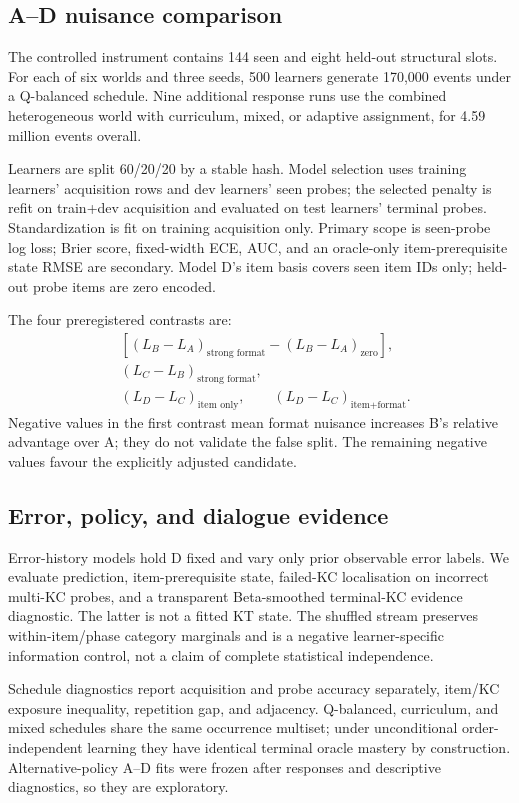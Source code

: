\subsection{A--D nuisance comparison}

The controlled instrument contains 144 seen and eight held-out structural
slots.  For each of six worlds and three seeds, 500 learners generate 170,000
events under a Q-balanced schedule.  Nine additional response runs use the
combined heterogeneous world with curriculum, mixed, or adaptive assignment,
for 4.59 million events overall.

Learners are split 60/20/20 by a stable hash.  Model selection uses training
learners' acquisition rows and dev learners' seen probes; the selected penalty
is refit on train+dev acquisition and evaluated on test learners' terminal
probes.  Standardization is fit on training acquisition only.  Primary scope is
seen-probe log loss; Brier score, fixed-width ECE, AUC, and an oracle-only
item-prerequisite state RMSE are secondary.  Model D's item basis covers seen
item IDs only; held-out probe items are zero encoded.

The four preregistered contrasts are:
\begin{align*}
&[(L_B-L_A)_{\text{strong format}}-(L_B-L_A)_{\text{zero}}],\\
&(L_C-L_B)_{\text{strong format}},\\
&(L_D-L_C)_{\text{item only}},\qquad
(L_D-L_C)_{\text{item+format}} .
\end{align*}
Negative values in the first contrast mean format nuisance increases B's
relative advantage over A; they do not validate the false split.  The remaining
negative values favour the explicitly adjusted candidate.

\subsection{Error, policy, and dialogue evidence}

Error-history models hold D fixed and vary only prior observable error labels.
We evaluate prediction, item-prerequisite state, failed-KC localisation on
incorrect multi-KC probes, and a transparent Beta-smoothed terminal-KC evidence
diagnostic.  The latter is not a fitted KT state.  The shuffled stream preserves
within-item/phase category marginals and is a negative learner-specific
information control, not a claim of complete statistical independence.

Schedule diagnostics report acquisition and probe accuracy separately, item/KC
exposure inequality, repetition gap, and adjacency.  Q-balanced, curriculum,
and mixed schedules share the same occurrence multiset; under unconditional
order-independent learning they have identical terminal oracle mastery by
construction.  Alternative-policy A--D fits were frozen after responses and
descriptive diagnostics, so they are exploratory.

